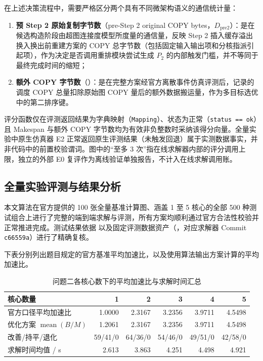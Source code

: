 \documentclass[anonymous,withtoc]{gmcm2026}
\providecommand{\tightlist}{\setlength{\itemsep}{0pt}\setlength{\parskip}{0pt}}
\begin{document}
在上述决策流程中，需要严格区分两个具有不同微架构语义的通信统计量：

\begin{enumerate}
\def\labelenumi{\arabic{enumi}.}
\tightlist
\item
  \textbf{预 Step 2 原始复制字节数}（pre-Step 2 original COPY bytes，\(D_{\mathrm{pre2}}\)）：是在候选构造阶段由超图连接度模型所度量的通信量，反映 Step 2 插入缓存溢出换入换出前重建方案的 COPY 总字节数（包括固定输入输出项和分核指派引起项），作为决定是否调用重排模块尝试生成 \(P_2\) 的内部触发门槛，并不等同于最终完成时间的缩短；
\item
  \textbf{额外 COPY 字节数}（\texttt{}）：是在完整方案经官方离散事件仿真评测后，记录的调度 COPY 总量扣除原始图 COPY 量后的额外数据搬运量，作为多目标选优中的第二排序键。
\end{enumerate}

评分函数仅在评测返回结果为字典映射（\texttt{Mapping}）、状态为正常（\texttt{status\ ==\ \textquotesingle{}ok\textquotesingle{}}）且 Makespan 与额外 COPY 字节数均为有效非负整数时采纳该得分向量。全量实验中原生仿真器 E2 正常返回原生评测结果（未触发回退）属于实测数据事实，并非代码中的前置校验谓词。图中的``至多 3 次''指在线求解器内部的评分调用上限，独立的外部 E0 复评作为离线验证单独报告，不计入在线求解调用账。

\subsection{全量实验评测与结果分析}

本文算法在官方提供的 100 张全量基准计算图、涵盖 1 至 5 核心的全部 500 种测试组合上进行了完整的端到端求解与评测，所有方案均顺利通过官方合法性校验并正常推进完成。测试结果依据 \texttt{} 以及固定评测数据资产（\texttt{}，对应求解器 Commit \texttt{c66559a}）进行了精确复核。

下表分别列出题目规定的官方基准平均加速比，以及使用算法输出方案计算的平均加速比。



\begin{table}[!htbp]\centering
\caption{问题二各核心数下的平均加速比与求解时间汇总}\label{tab:05-p2-1}\normalsize

\begin{tabularx}{\linewidth}{@{}Xrrrrr@{}}\toprule
核心数量 & 1 & 2 & 3 & 4 & 5 \\
\midrule
官方口径平均加速比 & 1.0000 & 2.3167 & 3.2356 & 3.9711 & 4.5498 \\
优化方案 $\operatorname{mean}(B/M)$ & 1.2061 & 2.3167 & 3.2356 & 3.9711 & 4.5498 \\
改善/持平/退化 & 59/41/0 & 64/36/0 & 54/46/0 & 49/51/0 & 42/58/0 \\
求解时间均值 / s & 2.613 & 3.863 & 4.251 & 4.498 & 4.921 \\
\bottomrule\end{tabularx}\end{table}
\end{document}
